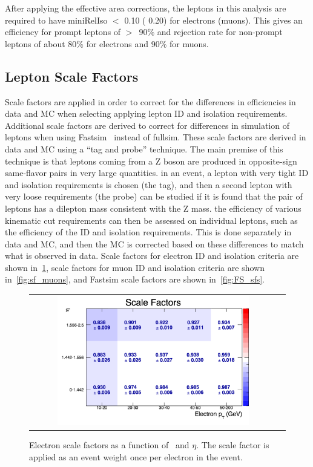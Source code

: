 After applying the effective area corrections,
the leptons in this analysis are required to have miniRelIso $<$ 0.10 ( 0.20) for electrons (muons). 
This gives an efficiency for prompt leptons of $>$~90\% and rejection rate for non-prompt leptons of about 80\% for electrons and 90\% for muons.
\clearpage

\subsection{Lepton Scale Factors}
Scale factors are applied in order to correct for the differences in efficiencies in data and MC when selecting applying lepton ID and isolation requirements.
Additional scale factors are derived to correct for differences in simulation of leptons when using Fastsim~\cite{fastsim} instead of fullsim.
These scale factors are derived in data and MC using a ``tag and probe'' technique.
The main premise of this technique is that leptons coming from a Z boson are produced in opposite-sign same-flavor pairs in very large quantities.
in an event, a lepton with very tight ID and isolation requirements is chosen (the tag),
and then a second lepton with very loose requirements (the probe) can be studied if it is found that the pair of leptons has a dilepton mass consistent with the Z mass.
the efficiency of various kinematic cut requirements can then be assessed on individual leptons, such as the efficiency of the ID and isolation requirements.
This is done separately in data and MC, and then the MC is corrected based on these differences to match what is observed in data.
Scale factors for electron ID and isolation criteria are shown in~\ref{fig:sf_electrons},
scale factors for muon ID and isolation criteria are shown in~\ref{fig:sf_muons},
and Fastsim scale factors are shown in~\ref{fig:FS_sfs}.
\begin{figure}[!ht]
  \begin{center}
    \begin{tabular}{cc}
      \includegraphics[width=0.8\textwidth]{evtsel/figs/sf_el_tight2d3d.pdf}  
    \end{tabular}
    \caption{
      \label{fig:sf_electrons}
      Electron scale factors as a function of \pt\ and $\eta$.
      The scale factor is applied as an event weight once per electron in the event.
    }
  \end{center}
\end{figure}

